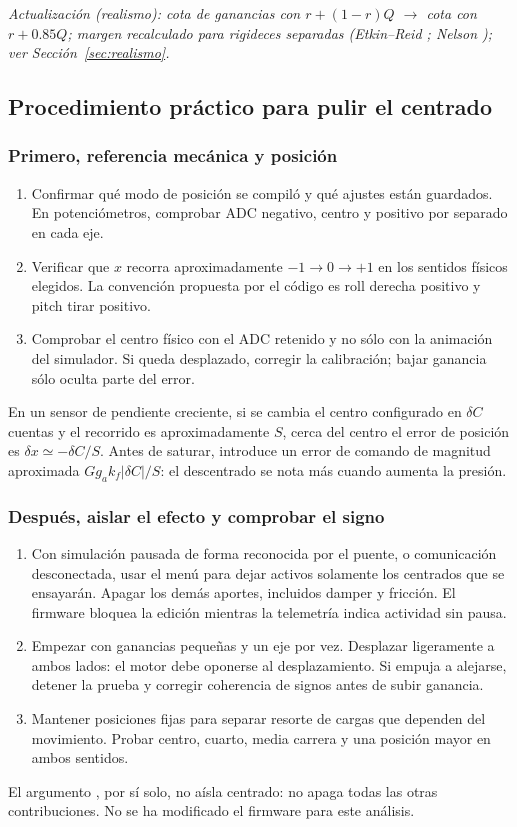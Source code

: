 \textit{Actualización (realismo): cota de ganancias con $r+(1-r)Q$ $\rightarrow$ cota con $r+0.85Q$; margen recalculado para rigideces separadas (Etkin--Reid \cite{etkin1996}; Nelson \cite{nelson1998}); ver Sección~\ref{sec:realismo}.}

\subsection{Procedimiento práctico para pulir el centrado}
\subsubsection{Primero, referencia mecánica y posición}
\begin{enumerate}
\item Confirmar qué modo de posición se compiló y qué ajustes están guardados. En potenciómetros, comprobar ADC negativo, centro y positivo por separado en cada eje.
\item Verificar que $x$ recorra aproximadamente $-1\to0\to+1$ en los sentidos físicos elegidos. La convención propuesta por el código es roll derecha positivo y pitch tirar positivo.
\item Comprobar el centro físico con el ADC retenido y no sólo con la animación del simulador. Si queda desplazado, corregir la calibración; bajar ganancia sólo oculta parte del error.
\end{enumerate}
En un sensor de pendiente creciente, si se cambia el centro configurado en $\delta C$ cuentas y el recorrido es aproximadamente $S$, cerca del centro el error de posición es $\delta x\simeq-\delta C/S$. Antes de saturar, introduce un error de comando de magnitud aproximada $Gg_ak_f|\delta C|/S$: el descentrado se nota más cuando aumenta la presión.

\subsubsection{Después, aislar el efecto y comprobar el signo}
\begin{enumerate}
\item Con simulación pausada de forma reconocida por el puente, o comunicación desconectada, usar el menú para dejar activos solamente los centrados que se ensayarán. Apagar los demás aportes, incluidos damper y fricción. El firmware bloquea la edición mientras la telemetría indica actividad sin pausa.
\item Empezar con ganancias pequeñas y un eje por vez. Desplazar ligeramente a ambos lados: el motor debe oponerse al desplazamiento. Si empuja a alejarse, detener la prueba y corregir coherencia de signos antes de subir ganancia.
\item Mantener posiciones fijas para separar resorte de cargas que dependen del movimiento. Probar centro, cuarto, media carrera y una posición mayor en ambos sentidos.
\end{enumerate}
El argumento , por sí solo, no aísla centrado: no apaga todas las otras contribuciones. No se ha modificado el firmware para este análisis.

